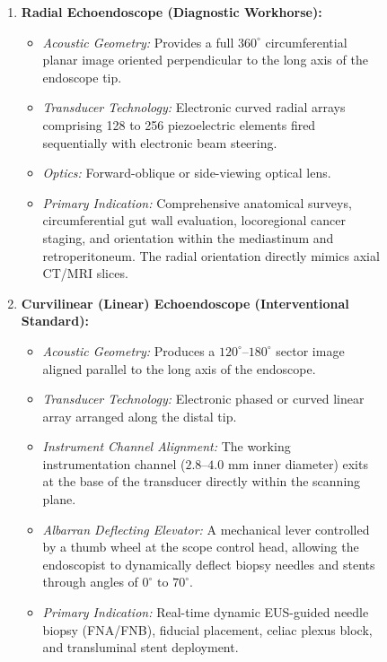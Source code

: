 \documentclass[11pt,a4paper]{article}
\begin{document}
\begin{figure}[htbp]
\centering
\begin{tcolorbox}[colback=blue!5!white,colframe=blue!60!black,title=\textbf{Architectural Taxonomy: Radial vs. Linear Echoendoscopes},width=\linewidth]
\small
\begin{enumerate}[leftmargin=1.5em]
    \item \textbf{Radial Echoendoscope (Diagnostic Workhorse):}
    \begin{itemize}
        \item \textit{Acoustic Geometry:} Provides a full $360^\circ$ circumferential planar image oriented perpendicular to the long axis of the endoscope tip.
        \item \textit{Transducer Technology:} Electronic curved radial arrays comprising 128 to 256 piezoelectric elements fired sequentially with electronic beam steering.
        \item \textit{Optics:} Forward-oblique or side-viewing optical lens.
        \item \textit{Primary Indication:} Comprehensive anatomical surveys, circumferential gut wall evaluation, locoregional cancer staging, and orientation within the mediastinum and retroperitoneum. The radial orientation directly mimics axial CT/MRI slices.
    \end{itemize}
    \item \textbf{Curvilinear (Linear) Echoendoscope (Interventional Standard):}
    \begin{itemize}
        \item \textit{Acoustic Geometry:} Produces a $120^\circ\text{--}180^\circ$ sector image aligned parallel to the long axis of the endoscope.
        \item \textit{Transducer Technology:} Electronic phased or curved linear array arranged along the distal tip.
        \item \textit{Instrument Channel Alignment:} The working instrumentation channel ($2.8\text{--}4.0\text{ mm}$ inner diameter) exits at the base of the transducer directly within the scanning plane.
        \item \textit{Albarran Deflecting Elevator:} A mechanical lever controlled by a thumb wheel at the scope control head, allowing the endoscopist to dynamically deflect biopsy needles and stents through angles of $0^\circ\text{ to }70^\circ$.
        \item \textit{Primary Indication:} Real-time dynamic EUS-guided needle biopsy (FNA/FNB), fiducial placement, celiac plexus block, and transluminal stent deployment.

\end{itemize}
\end{enumerate}
\end{tcolorbox}
\end{figure}
\end{document}
